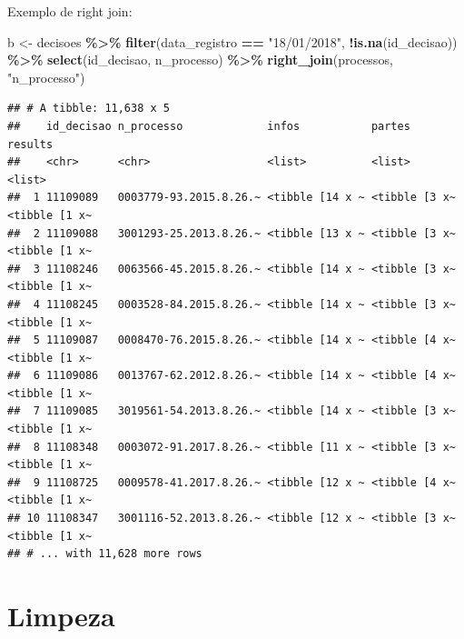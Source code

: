 \documentclass[
  10pt,
  ignorenonframetext,
]{beamer}
\newenvironment{Shaded}{\begin{snugshade}}{\end{snugshade}}
\newcommand{\KeywordTok}[1]{\textcolor[rgb]{0.13,0.29,0.53}{\textbf{#1}}}
\newcommand{\NormalTok}[1]{#1}
\newcommand{\OperatorTok}[1]{\textcolor[rgb]{0.81,0.36,0.00}{\textbf{#1}}}
\newcommand{\StringTok}[1]{\textcolor[rgb]{0.31,0.60,0.02}{#1}}
\begin{document}
\begin{frame}[fragile]{Exemplo de right join:}
\protect\hypertarget{exemplo-de-right-join}{}
\begin{Shaded}
\begin{Highlighting}[]
\NormalTok{b \textless{}{-}}\StringTok{ }\NormalTok{decisoes }\OperatorTok{\%\textgreater{}\%}\StringTok{ }
\StringTok{  }\KeywordTok{filter}\NormalTok{(data\_registro }\OperatorTok{==}\StringTok{ "18/01/2018"}\NormalTok{, }\OperatorTok{!}\KeywordTok{is.na}\NormalTok{(id\_decisao)) }\OperatorTok{\%\textgreater{}\%}\StringTok{ }
\StringTok{  }\KeywordTok{select}\NormalTok{(id\_decisao, n\_processo) }\OperatorTok{\%\textgreater{}\%}\StringTok{ }
\StringTok{  }\KeywordTok{right\_join}\NormalTok{(processos, }\StringTok{"n\_processo"}\NormalTok{)}
\end{Highlighting}
\end{Shaded}
\end{frame}

\begin{frame}[fragile]{}
\protect\hypertarget{section-6}{}
\begin{verbatim}
## # A tibble: 11,638 x 5
##    id_decisao n_processo             infos           partes        results      
##    <chr>      <chr>                  <list>          <list>        <list>       
##  1 11109089   0003779-93.2015.8.26.~ <tibble [14 x ~ <tibble [3 x~ <tibble [1 x~
##  2 11109088   3001293-25.2013.8.26.~ <tibble [13 x ~ <tibble [3 x~ <tibble [1 x~
##  3 11108246   0063566-45.2015.8.26.~ <tibble [14 x ~ <tibble [3 x~ <tibble [1 x~
##  4 11108245   0003528-84.2015.8.26.~ <tibble [14 x ~ <tibble [3 x~ <tibble [1 x~
##  5 11109087   0008470-76.2015.8.26.~ <tibble [14 x ~ <tibble [4 x~ <tibble [1 x~
##  6 11109086   0013767-62.2012.8.26.~ <tibble [14 x ~ <tibble [4 x~ <tibble [1 x~
##  7 11109085   3019561-54.2013.8.26.~ <tibble [14 x ~ <tibble [3 x~ <tibble [1 x~
##  8 11108348   0003072-91.2017.8.26.~ <tibble [11 x ~ <tibble [3 x~ <tibble [1 x~
##  9 11108725   0009578-41.2017.8.26.~ <tibble [12 x ~ <tibble [4 x~ <tibble [1 x~
## 10 11108347   3001116-52.2013.8.26.~ <tibble [12 x ~ <tibble [3 x~ <tibble [1 x~
## # ... with 11,628 more rows
\end{verbatim}
\end{frame}

\hypertarget{limpeza}{%
\section{Limpeza}\label{limpeza}}
\end{document}
